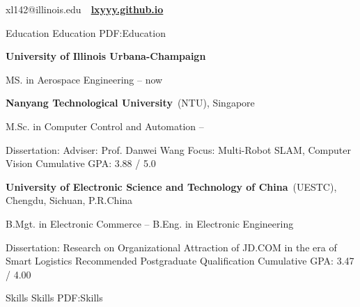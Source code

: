 \documentclass[letterpaper,MMMyyyy,nonstopmode]{simpleresumecv}
\newcommand{\CVAuthor}{Mike Xiangyu Liu}
\begin{document}

\Title{\CVAuthor}

\begin{SubTitle}
\par
\href{xl142@illinois.edu}
\large{xl142@illinois.edu}
\,\SubBulletSymbol\,
\href{https://lxyyy.github.io/}
\large{\textbf{\underline{lxyyy.github.io}}}
\end{SubTitle}

\begin{Body}


\Section
{Education}
{Education}
{PDF:Education}

\Entry
{\textbf{University of Illinois Urbana-Champaign}}

\BulletItem
MS. in Aerospace Engineering
\hfill
{} --
now

\BigGap
\Entry
{\textbf{Nanyang Technological University}~(NTU)},
Singapore

\BulletItem
M.Sc. in
{Computer Control and Automation}
\hfill
{} --
\begin{Detail}
\SubBulletItem
Dissertation:
{\href{https://www.researchgate.net/publication/340996925_QUANTITATIVE_TRAJECTORY_EVALUATION_CRITERION_AND_LONG-TERM_ENHANCEMENT_FOR_MULTI-ROBOT_SLAM}{\color{blue}{Quantitative Trajectory Evaluation Criterion and Long-term Enhancement for Multi-Robot SLAM}}\cite{xiangyu2019quantitative}}
\SubBulletItem
Adviser:
Prof. Danwei Wang
\SubBulletItem
Focus:
Multi-Robot SLAM, Computer Vision
\SubBulletItem
Cumulative GPA: 3.88 / 5.0
\end{Detail}

\BigGap
\Entry
{\textbf{University of Electronic Science and Technology of China}~(UESTC)},
Chengdu, Sichuan, P.R.China

\BulletItem
B.Mgt. in 
{Electronic Commerce}
\hfill
{} --
\BulletItem
B.Eng. in 
{Electronic Engineering}
\begin{Detail}
\SubBulletItem
Dissertation:
	{Research on Organizational Attraction of JD.COM in the era of Smart Logistics \cite{lxybachelor2018}}
\SubBulletItem
Recommended Postgraduate Qualification
\SubBulletItem
Cumulative GPA: 3.47 / 4.00
\end{Detail}


\Section
{Skills}
{Skills}
{PDF:Skills}


\end{Body}
\end{document}

